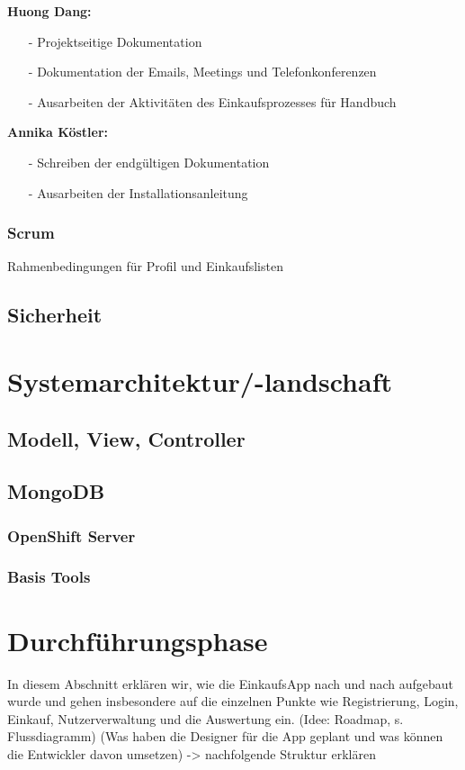 \documentclass[12pt,a4paper]{article}
\begin{document}
\textbf{Huong Dang:}
\begin{itemize}
\item[-] Projektseitige Dokumentation
\item[-] Dokumentation der Emails, Meetings und Telefonkonferenzen
\item[-] Ausarbeiten der Aktivitäten des Einkaufsprozesses für Handbuch 
\end{itemize}

\textbf{Annika Köstler:}
\begin{itemize}
\item[-] Schreiben der endgültigen Dokumentation
\item[-] Ausarbeiten der Installationsanleitung 
\end{itemize}
\newpage

\subsubsection{Scrum}
Rahmenbedingungen für Profil und Einkaufslisten
\newpage
\subsection{Sicherheit}
\newpage


\section{Systemarchitektur/-landschaft}
\newpage
\subsection{Modell, View, Controller}
\newpage
\subsection{MongoDB}
\newpage
\subsubsection{OpenShift Server}
\newpage
\subsubsection{Basis Tools}
\newpage

\section{Durchführungsphase}
In diesem Abschnitt erklären wir, wie die EinkaufsApp nach und nach aufgebaut wurde und gehen insbesondere auf die einzelnen Punkte wie Registrierung, Login, Einkauf, Nutzerverwaltung und die Auswertung ein.
(Idee: Roadmap, s. Flussdiagramm) (Was haben die Designer für die App geplant und was können die Entwickler davon umsetzen) -> nachfolgende Struktur erklären
\end{document}
